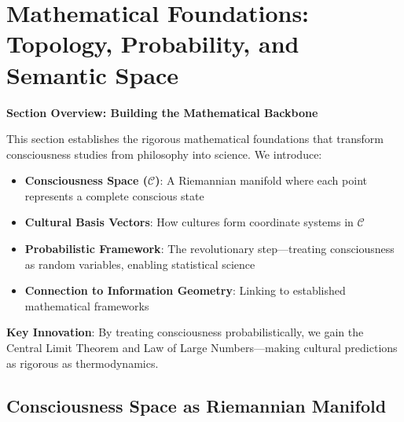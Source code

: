 \documentclass[11pt,a4paper]{article}
\theoremstyle{definition}
\theoremstyle{remark}
\newcommand{\CC}{\mathcal{C}}
\begin{document}

\section{Mathematical Foundations: Topology, Probability, and Semantic Space}

\begin{mdframed}[backgroundcolor=cyan!5,linewidth=2pt]
\textbf{Section Overview: Building the Mathematical Backbone}

This section establishes the rigorous mathematical foundations that transform consciousness studies from philosophy into science. We introduce:

\begin{itemize}[nosep]
    \item \textbf{Consciousness Space (\(\CC\))}: A Riemannian manifold where each point represents a complete conscious state
    \item \textbf{Cultural Basis Vectors}: How cultures form coordinate systems in \(\CC\)
    \item \textbf{Probabilistic Framework}: The revolutionary step—treating consciousness as random variables, enabling statistical science
    \item \textbf{Connection to Information Geometry}: Linking to established mathematical frameworks
\end{itemize}

\textbf{Key Innovation}: By treating consciousness probabilistically, we gain the Central Limit Theorem and Law of Large Numbers—making cultural predictions as rigorous as thermodynamics.
\end{mdframed}

\subsection{Consciousness Space as Riemannian Manifold}
\end{document}
